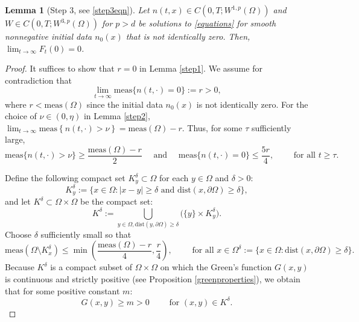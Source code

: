 \documentclass[12pt]{article}
\theoremstyle{plain}
\newtheorem{lemma}{Lemma}[section]
\begin{document}
\begin{lemma}[Step 3, see \eqref{step3eqn}]\label{step3}
Let $n(t, x) \in C(0, T; W^{1, p}(\Omega))$ and $W \in C(0, T; W^{3, p}(\Omega))$ for $p > d$ be solutions to \eqref{equations} for smooth nonnegative initial data $n_{0}(x)$ that is not identically zero. Then, $\lim_{t \to \infty} F_{t}(0) = 0$.
\end{lemma}

\begin{proof}
It suffices to show that $r = 0$ in Lemma \ref{step1}. We assume for contradiction that
\begin{equation}\label{rdef}
\lim_{t \to \infty} \text{meas}\{n(t, \cdot) = 0\} := r > 0,
\end{equation}
where $r < \text{meas}(\Omega)$ since the initial data $n_0(x)$ is not identically zero. For the choice of $\nu \in (0, \eta)$ in Lemma \ref{step2}, $\lim_{t \to \infty} \text{meas}\left\{n(t, \cdot) > \nu\right\} = \text{meas}(\Omega) - r$. Thus, for some $\tau$ sufficiently large, 
\begin{equation}\label{measT}
\text{meas}\{n(t, \cdot) > \nu\} \ge \frac{\text{meas}(\Omega) - r}{2} \quad \text{ and } \quad \text{meas}\{n(t, \cdot) = 0\} \le \frac{5r}{4}, \qquad \text{ for all } t \ge \tau.
\end{equation}

Define the following compact set $K^{\delta}_{y} \subset \Omega$ for each $y \in \Omega$ and $\delta > 0$:
\begin{equation*}
K^{\delta}_{y} := \{x \in \Omega : |x - y| \ge \delta \text{ and } \text{dist}(x, \partial \Omega) \ge \delta\},
\end{equation*}
and let $K^{\delta} \subset \Omega \times \Omega$ be the compact set:
\begin{equation*}
K^{\delta} := \bigcup_{y \in \Omega, \text{dist}(y, \partial \Omega) \ge \delta} \Big(\{y\} \times K_{y}^{\delta}\Big).
\end{equation*}
Choose $\delta$ sufficiently small so that 
\begin{equation}\label{Kdeltameas}
\text{meas}(\Omega \setminus K_{x}^{\delta}) \le \min\left(\frac{\text{meas}(\Omega) - r}{4}, \frac{r}{4}\right), \qquad \text{ for all } x \in \Omega^{\delta} := \{x \in \Omega : \text{dist}(x, \partial \Omega) \ge \delta\}.
\end{equation}
Because $K^{\delta}$ is a compact subset of $\Omega \times \Omega$ on which the Green's function $G(x, y)$ is continuous and strictly positive (see Proposition \ref{greenproperties}), we obtain that for some positive constant $m$:
\begin{equation}\label{Gpositive}
G(x, y) \ge m > 0 \qquad \text{ for $(x, y) \in K^{\delta}$}.
\end{equation}


\end{proof}
\end{document}
